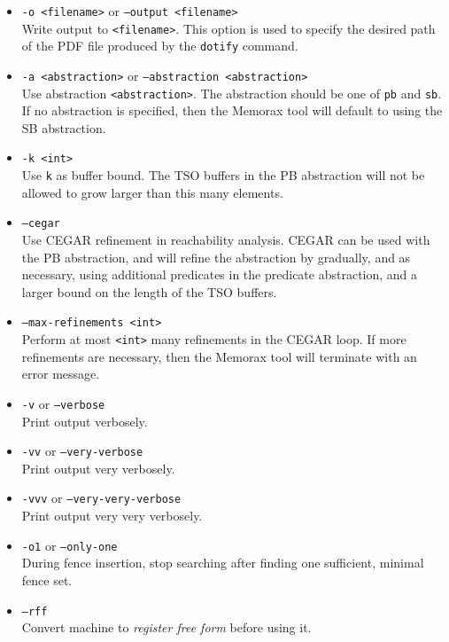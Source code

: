 \documentclass[a4paper]{article}
\newcommand{\thetool}{the Memorax tool} %
\begin{document}
\begin{itemize}
\item {\tt -o <filename>} or {\tt --output <filename>}\\ Write output
  to {\tt <filename>}. This option is used to specify the desired path
  of the PDF file produced by the {\tt dotify} command.

\item {\tt -a <abstraction>} or {\tt --abstraction <abstraction>}
  \\ Use abstraction {\tt <abstraction>}. The abstraction should be
  one of {\tt pb} and {\tt sb}. If no abstraction is specified, then
  \thetool{} will default to using the SB abstraction.

\item {\tt -k <int>}\\ Use {\tt k} as buffer bound. The TSO buffers in
  the PB abstraction will not be allowed to grow larger than this many
  elements.

\item {\tt --cegar}\\ Use CEGAR refinement in reachability
  analysis. CEGAR can be used with the PB abstraction, and will refine
  the abstraction by gradually, and as necessary, using additional
  predicates in the predicate abstraction, and a larger bound on the
  length of the TSO buffers.

\item {\tt --max-refinements <int>}\\ Perform at most {\tt <int>} many
  refinements in the CEGAR loop. If more refinements are necessary,
  then \thetool{} will terminate with an error message.

\item {\tt -v} or {\tt --verbose}\\
  Print output verbosely.
\item {\tt -vv} or {\tt --very-verbose}\\
  Print output very verbosely.
\item {\tt -vvv} or {\tt --very-very-verbose}\\
  Print output very very verbosely.
\item {\tt -o1} or {\tt --only-one}\\
  During fence insertion, stop searching after finding one sufficient, minimal fence set.
\item {\tt --rff}\\
  Convert machine to \emph{register free form}
  before using it. \explainrff
\end{itemize}
\end{document}
